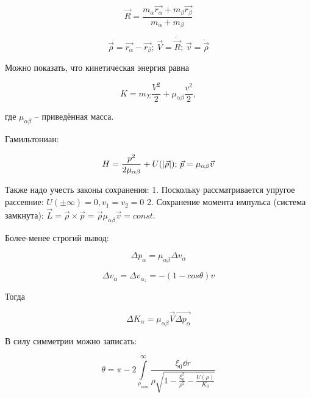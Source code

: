 \documentclass[10pt, a4paper]{article}
\begin{document}
\begin{equation} \label{eq:center_mass}
	\vec{R} = \frac{m_\alpha\vec{r_\alpha}+m_\beta\vec{r_\beta}}{m_\alpha+m_\beta}
\end{equation}

\begin{equation*}
	\vec{\rho} = \vec{r_\alpha}-\vec{r_\beta};\,
	\vec{V} = \dot{\vec{R}};\,
	\vec{v} = \dot{\vec{\rho}}
\end{equation*}

Можно показать, что кинетическая энергия равна

\begin{equation*}
	K = m_\Sigma\frac{V^2}{2}+\mu_{\alpha\beta}\frac{v^2}{2},
\end{equation*}

где $\mu_{\alpha\beta}$ -- приведённая масса. 

Гамильтониан:

\begin{equation*}
	H = \frac{p^2}{2\mu_{\alpha\beta}}+U(\abs{\vec{\rho}});\,
	\vec{p} = \mu_{\alpha\beta}\vec{v}
\end{equation*}

Также надо учесть законы сохранения: 1. Поскольку рассматривается упругое рассеяние: $U(\pm \infty) = 0, v_1 = v_2 = 0$ 2. Сохранение момента импульса (система замкнута): $\vec{L} = \vec{\rho} \times \vec{p} = \vec{\rho} \mu_{\alpha\beta} \vec{v} = const$.

Более-менее строгий вывод:

\begin{equation*}
	\Delta p_\alpha = \mu_{\alpha\beta} \Delta v_\alpha
\end{equation*}

\begin{equation*}
	\Delta v_\alpha = \Delta v_{\alpha_{z}} = -(1-cos\theta)v
\end{equation*}

Тогда

\begin{equation} \label{eq:center_mass_K}
	\Delta K_\alpha = \mu_{\alpha\beta}\vec{V}\overrightarrow{\Delta p_\alpha} 
\end{equation}

В силу симметрии можно записать:

\begin{equation*}
	\theta = \pi - 2 \int\limits_{\rho_{min}}^{\infty}\frac{\xi_0 \dd r}{\rho\sqrt{1-\frac{\xi_0^2}{\rho^2}-\frac{U(\rho)}{K_0}}}
\end{equation*}
\end{document}
